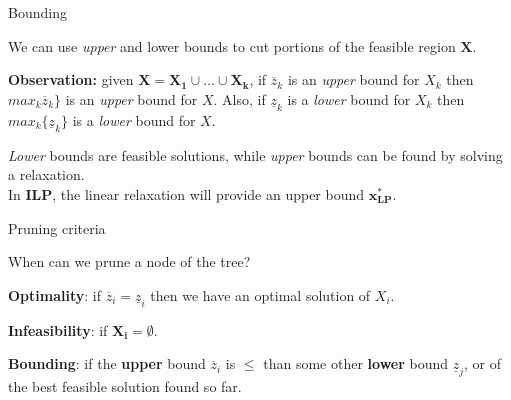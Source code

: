 \documentclass[13pt]{beamer}
\begin{document}
\begin{frame}{Bounding}
    \begin{fullpageitemize}
        \item<1->We can use \textit{upper} and {lower} bounds to cut portions of the feasible region $\mathbf{X}$.
        \item<2->\textbf{Observation:} given $\mathbf{X = X_1 \cup \ldots \cup X_k}$, if $\overline{z}_k$ is an \textit{upper} bound for $X_k$ then $max_k{\overline{z}_k\}}$ is an \textit{upper} bound for $X$. Also, if $\underline{z}_k$ is a \textit{lower} bound for $X_k$ then $max_k{\{\underline{z}_k\}}$ is a \textit{lower} bound for $X$.
        \item<3->\textit{Lower} bounds are feasible solutions, while \textit{upper} bounds can be found by solving a relaxation.\\
        In \textbf{ILP}, the linear relaxation will provide an upper bound $\mathbf{x^*_{LP}}$.
    \end{fullpageitemize}
\end{frame}    

\begin{frame}{Pruning criteria}
    \begin{fullpageitemize}
        \item<1->When can we prune a node of the tree?
        \begin{baseitemize}
            \item<2->[\rtarrow]\textbf{Optimality}: if $\overline{z}_i = \underline{z}_i$ then we have an optimal solution of $X_i$.
            \item<3->[\rtarrow]\textbf{Infeasibility}: if $\mathbf{X_i = \emptyset}$.
            \item<4->[\rtarrow]\textbf{Bounding}: if the \textbf{upper} bound $\overline{z}_i$ is $\mathbf{\leq}$ than some other \textbf{lower} bound $\underline{z}_j$, or of the best feasible solution found so far.
        \end{baseitemize}	
    \end{fullpageitemize}
\end{frame}    
\end{document}
